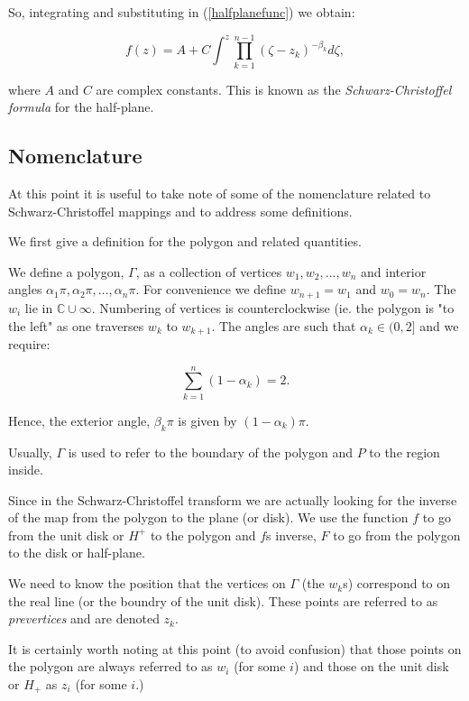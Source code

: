 \documentclass[a4paper,10pt]{amsart}
\newcommand{\sch}{Schwarz-Christoffel }
\begin{document}
So, integrating and substituting in (\ref{halfplanefunc}) we obtain:

\begin{equation}
f(z) = A + C \int^z \prod_{k=1}^{n-1} (\zeta-z_k)^{-\beta_k} d\zeta,
\end{equation}

where $A$ and $C$ are complex constants. This is known as the \emph{\sch formula} for the half-plane.


\subsection{Nomenclature}

At this point it is useful to take note of some of the nomenclature related to \sch mappings and to address some definitions.

We first give a definition for the polygon and related quantities.

\begin{defn}[Polygon]
We define a polygon, $\Gamma$, as a collection of vertices $w_1, w_2,\dots,w_n$ and interior angles $\alpha_1\pi, \alpha_2\pi, \dots, \alpha_n\pi$. For convenience we define $w_{n+1} = w_1$ and $w_0=w_n$. The $w_i$ lie in $\mathbb{C} \cup {\infty}$. Numbering of vertices is counterclockwise (ie. the polygon is "to the left" as one traverses $w_k$ to $w_{k+1}$. The angles are such that $\alpha_k \in (0,2]$ and we require:

\begin{equation}
\sum_{k=1}^n (1-\alpha_k) = 2.
\end{equation}

Hence, the exterior angle, $\beta_k\pi$ is given by $(1-\alpha_k)\pi$.

Usually, $\Gamma$ is used to refer to the boundary of the polygon and $P$ to the region inside.

\end{defn}

Since in the \sch transform we are actually looking for the inverse of the map from the polygon to the plane (or disk). We use the function $f$ to go from the unit disk or $H^+$ to the polygon and $f$s inverse, $F$ to go from the polygon to the disk or half-plane.  

We need to know the position that the vertices on $\Gamma$ (the $w_k$s) correspond to on the real line (or the boundry of the unit disk). These points are referred to as \emph{prevertices} and are denoted $z_k$.

It is certainly worth noting at this point (to avoid confusion) that those points on the polygon are always referred to as $w_i$ (for some $i$) and those on the unit disk or $H_+$ as $z_i$ (for some $i$.)
\end{document}
